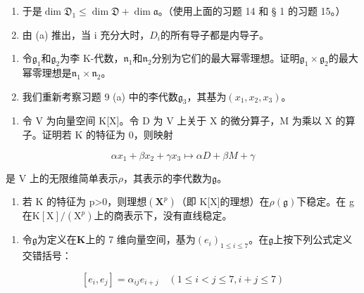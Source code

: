 \begin{enumerate}
\def\labelenumi{(\alph{enumi})}
\item
  于是\(\dim \mathfrak{D}_1 \leqslant \dim \mathfrak{D} + \dim \mathfrak{a}\)。（使用上面的习题 14 和 § 1 的习题 15。）
\item
  由 (a) 推出，当 i 充分大时，\(D_{i}\)的所有导子都是内导子。
\end{enumerate}

\begin{enumerate}
\def\labelenumi{\arabic{enumi}.}
\setcounter{enumi}{15}
\item
  令\(\mathfrak{g}_1\)和\(\mathfrak{g}_2\)为李 K-代数，\(\mathfrak{n}_1\)和\(\mathfrak{n}_2\)分别为它们的最大幂零理想。证明\(\mathfrak{g}_1 \times \mathfrak{g}_2\)的最大幂零理想是\(\mathfrak{n}_1 \times \mathfrak{n}_2\)。
\item
  我们重新考察习题 9 (a) 中的李代数\(\mathfrak{g}_3\)，其基为\((x_1, x_2, x_3)\)。
\end{enumerate}

\begin{enumerate}
\def\labelenumi{(\alph{enumi})}
\tightlist
\item
  令 V 为向量空间 K{[}X{]}。令 D 为 V 上关于 X 的微分算子，M 为乘以 X 的算子。证明若 K 的特征为 0，则映射
\end{enumerate}

\[
\alpha x _ {1} + \beta x _ {2} + \gamma x _ {3} \mapsto \alpha D + \beta M + \gamma
\]

是 V 上的无限维简单表示\(\rho\)，其表示的李代数为\(\mathfrak{g}\)。

\begin{enumerate}
\def\labelenumi{(\alph{enumi})}
\setcounter{enumi}{1}
\tightlist
\item
  若 K 的特征为 p\textgreater{}0，则理想\((\mathbf{X}^{p})\)（即 K{[}X{]}的理想）在\(\rho(\mathfrak{g})\)下稳定。在 g 在\(\mathrm{K}[\mathrm{X}] / (\mathrm{X}^{p})\)上的商表示下，没有直线稳定。
\end{enumerate}

\begin{enumerate}
\def\labelenumi{\arabic{enumi}.}
\setcounter{enumi}{17}
\tightlist
\item
  令\(\mathfrak{g}\)为定义在\(\mathbf{K}\)上的 7 维向量空间，基为\((e_i)_{1\leqslant i\leqslant 7}\)。在\(\mathfrak{g}\)上按下列公式定义交错括号：
\end{enumerate}

\[
\left[ e _ {i}, e _ {j} \right] = \alpha_ {i j} e _ {i + j} \quad (1 \leqslant i <   j \leqslant 7, i + j \leqslant 7)\tag{1}
\]

